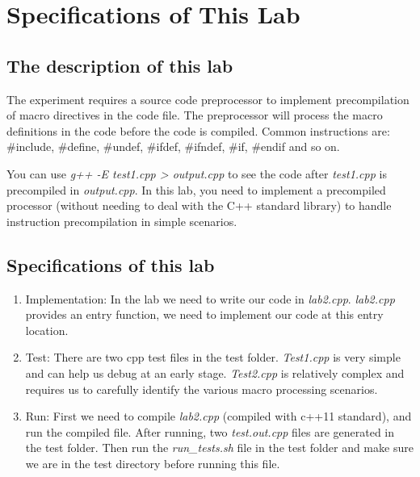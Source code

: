 \documentclass[a4paper]{report}
\begin{document}
\chapter{Specifications of This Lab}
\section{The description of this lab}
The experiment requires a source code preprocessor to implement precompilation of macro directives in the code file. The preprocessor will process the macro definitions in the code before the code is compiled. Common instructions are: \#include, \#define, \#undef, \#ifdef, \#ifndef, \#if, \#endif and so on.
\par
You can use \emph{g++ -E test1.cpp > output.cpp} to see the code after \emph{test1.cpp} is precompiled in \emph{output.cpp}. In this lab, you need to implement a precompiled processor (without needing to deal with the C++ standard library) to handle instruction precompilation in simple scenarios.
\section{Specifications of this lab}
\begin{enumerate}
\item
Implementation: In the lab we need to write our code in \emph{lab2.cpp}. \emph{lab2.cpp} provides an entry function, we need to implement our code at this entry location.
\item
Test: There are two cpp test files in the test folder. \emph{Test1.cpp} is very simple and can help us debug at an early stage. \emph{Test2.cpp} is relatively complex and requires us to carefully identify the various macro processing scenarios.
\item
Run: First we need to compile \emph{lab2.cpp} (compiled with c++11 standard), and run the compiled file. After running, two \emph{test.out.cpp} files are generated in the test folder. Then run the \emph{run\_tests.sh} file in the test folder and make sure we are in the test directory before running this file.
\end{enumerate}
\end{document}
